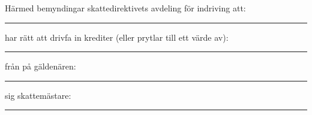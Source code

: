 \documentclass{letter}
\begin{document}
Härmed bemyndingar skattedirektivets avdeling för indriving att:
\vspace*{1cm}
\hrule

har rätt att drivfa in krediter (\Square eller prytlar till ett värde av):\\
\vspace*{1cm}
\hrule

från på gäldenären:
\vspace*{1cm}
\hrule

\vfill
sig skattemästare:
\vspace*{1cm}
\hrule
\end{document}
